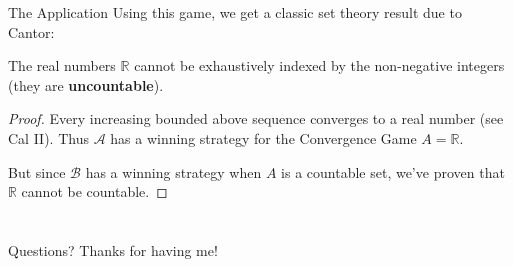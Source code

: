 \documentclass{beamer}
\theoremstyle{theorem}
\theoremstyle{definition}
\newcommand{\<}{\langle}
\renewcommand{\>}{\rangle}
\newcommand{\pl}[1]{\mathscr{#1}}
\newcommand{\vpause}{\pause\vspace{1em}}
\newcommand{\term}[1]{\textbf{#1}}
\begin{document}
\begin{frame}{The Application}
  Using this game, we get a classic set theory result due to Cantor:

  \vpause

  \begin{theorem}
    The real numbers $\mathbb{R}$ cannot be exhaustively indexed by the
    non-negative integers (they are \term{uncountable}).
  \end{theorem}

  \begin{proof}
    Every increasing bounded above sequence converges to a real number
    (see Cal II). Thus $\pl A$ has a winning strategy for
    the Convergence Game $A=\mathbb{R}$.

    But since $\pl B$ has a winning strategy when $A$ is a countable set, we've
    proven that $\mathbb{R}$ cannot be countable.
  \end{proof}
\end{frame}

\section*{}

\begin{frame}
Questions? Thanks for having me!
\end{frame}
\end{document}

